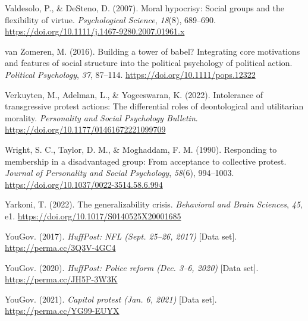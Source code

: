 \documentclass[twocolumn, 11pt, letterpaper]{article}
\newenvironment{CSLReferences}[2]{}{}
\begin{document}
\begin{CSLReferences}{1}{0}
\leavevmode{}%
Valdesolo, P., \& DeSteno, D. (2007). Moral hypocrisy: Social groups and
the flexibility of virtue. \emph{Psychological Science}, \emph{18}(8),
689--690. \url{https://doi.org/10.1111/j.1467-9280.2007.01961.x}

\leavevmode{}%
van Zomeren, M. (2016). Building a tower of babel? {Integrating} core
motivations and features of social structure into the political
psychology of political action. \emph{Political Psychology}, \emph{37},
87--114. \url{https://doi.org/10.1111/pops.12322}

\leavevmode{}%
Verkuyten, M., Adelman, L., \& Yogeeswaran, K. (2022). Intolerance of
transgressive protest actions: The differential roles of deontological
and utilitarian morality. \emph{Personality and Social Psychology
Bulletin}. \url{https://doi.org/10.1177/01461672221099709}

\leavevmode{}%
Wright, S. C., Taylor, D. M., \& Moghaddam, F. M. (1990). Responding to
membership in a disadvantaged group: From acceptance to collective
protest. \emph{Journal of Personality and Social Psychology},
\emph{58}(6), 994--1003.
\url{https://doi.org/10.1037/0022-3514.58.6.994}

\leavevmode{}%
Yarkoni, T. (2022). The generalizability crisis. \emph{Behavioral and
Brain Sciences}, \emph{45}, e1.
\url{https://doi.org/10.1017/S0140525X20001685}

\leavevmode{}%
YouGov. (2017). \emph{{HuffPost: NFL} {(Sept. 25--26, 2017)}} {[}Data
set{]}. \url{https://perma.cc/3Q3V-4GC4}

\leavevmode{}%
YouGov. (2020). \emph{{HuffPost}: Police reform {(Dec. 3--6, 2020)}}
{[}Data set{]}. \url{https://perma.cc/JH5P-3W3K}

\leavevmode{}%
YouGov. (2021). \emph{Capitol protest {(Jan. 6, 2021)}} {[}Data set{]}.
\url{https://perma.cc/YG99-EUYX}

\end{CSLReferences}

\endgroup

\newpage

\setcounter{table}{0}
\renewcommand{\thetable}{A\arabic{table}}
\end{document}
